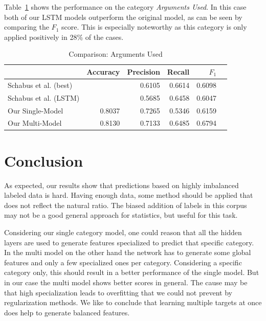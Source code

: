 \documentclass[11pt,a4paper]{article}
\begin{document}
Table~\ref{tab:results:arguments_used} shows the performance on the category \textit{Arguments Used}.
In this case both of our LSTM models outperform the original model, as can be seen by comparing the $F_1$ score.
This is especially noteworthy as this category is only applied positively in 28\% of the cases.  
\begin{table}[h!]
	\centering\scriptsize
	\begin{tabular}{l r r r r r}
		& Accuracy & Precision & Recall & $F_1$ \\
		\hline
		Schabus et al. (best) & & 0.6105 & 0.6614 & 0.6098 \\
		Schabus et al. (LSTM) & & 0.5685 & 0.6458 & 0.6047\\
		\hline
		Our Single-Model & 0.8037 & 0.7265 & 0.5346 & 0.6159 \\
		Our Multi-Model & 0.8130 & 0.7133 & 0.6485 & 0.6794 \\
	\end{tabular}
	\caption{Comparison: Arguments Used}
	\label{tab:results:arguments_used}
\end{table}


\section{Conclusion}

As expected, our results show that predictions based on highly imbalanced labeled data is hard. Having enough data, some method should be applied that does not reflect the natural ratio. The biased addition of labels in this corpus may not be a good general approach for statistics, but useful for this task.

Considering our single category model, one could reason that all the hidden layers are used to generate features specialized to predict that specific category. 
In the multi model on the other hand the network has to generate some global features and only a few specialized ones per category. 
Considering a specific category only, this should result in a better performance of the single model.
But in our case the multi model shows better scores in general. 
The cause may be that high specialization leads to overfitting that we could not prevent by regularization methods.
We like to conclude that learning multiple targets at once does help to generate balanced features.




\appendix

\end{document}
